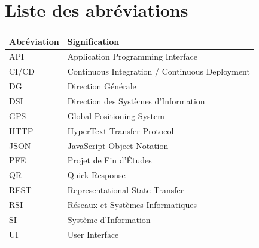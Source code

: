 \chapter*{Liste des abréviations}
{}

\begin{center}
\centering
\begin{tabular}{|p{3cm}|p{10cm}|}
\hline
\textbf{Abréviation} & \textbf{Signification} \\
\hline
API & Application Programming Interface \\
\hline
CI/CD & Continuous Integration / Continuous Deployment \\
\hline
DG & Direction Générale \\
\hline
DSI & Direction des Systèmes d'Information \\
\hline
GPS & Global Positioning System \\
\hline
HTTP & HyperText Transfer Protocol \\
\hline
JSON & JavaScript Object Notation \\
\hline
PFE & Projet de Fin d'Études \\
\hline
QR & Quick Response \\
\hline
REST & Representational State Transfer \\
\hline
RSI & Réseaux et Systèmes Informatiques \\
\hline
SI & Système d'Information \\
\hline
UI & User Interface \\
\hline
\end{tabular}
\end{center}
